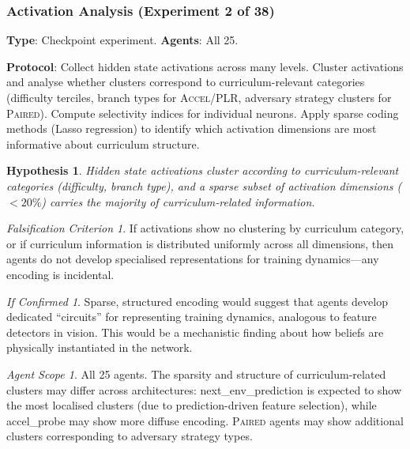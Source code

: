 \documentclass[11pt,a4paper]{article}
\newtheorem{hypothesis}{Hypothesis}[subsection]
\theoremstyle{remark}
\newtheorem*{falsification}{Falsification Criterion}
\newtheorem*{implication}{If Confirmed}
\newtheorem*{agentscope}{Agent Scope}
\newcommand{\paired}{\textsc{Paired}}
\newcommand{\accel}{\textsc{Accel}}
\newcommand{\plr}{\textsc{PLR}}
\begin{document}
\subsubsection{Activation Analysis (Experiment 2 of 38)}
\label{exp:activation_analysis}

\textbf{Type}: Checkpoint experiment. \textbf{Agents}: All 25.

\textbf{Protocol}: Collect hidden state activations across many levels. Cluster activations and analyse whether clusters correspond to curriculum-relevant categories (difficulty terciles, branch types for \accel{}/\plr{}, adversary strategy clusters for \paired{}). Compute selectivity indices for individual neurons. Apply sparse coding methods (Lasso regression) to identify which activation dimensions are most informative about curriculum structure.

\begin{hypothesis}
Hidden state activations cluster according to curriculum-relevant categories (difficulty, branch type), and a sparse subset of activation dimensions ($<20\%$) carries the majority of curriculum-related information.
\end{hypothesis}

\begin{falsification}
If activations show no clustering by curriculum category, or if curriculum information is distributed uniformly across all dimensions, then agents do not develop specialised representations for training dynamics---any encoding is incidental.
\end{falsification}

\begin{implication}
Sparse, structured encoding would suggest that agents develop dedicated ``circuits'' for representing training dynamics, analogous to feature detectors in vision. This would be a mechanistic finding about how beliefs are physically instantiated in the network.
\end{implication}

\begin{agentscope}
All 25 agents. The sparsity and structure of curriculum-related clusters may differ across architectures: next\_env\_prediction is expected to show the most localised clusters (due to prediction-driven feature selection), while accel\_probe may show more diffuse encoding. \paired{} agents may show additional clusters corresponding to adversary strategy types.
\end{agentscope}
\end{document}
